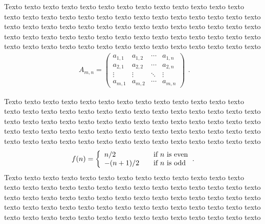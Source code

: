 Texto texto texto texto texto texto texto texto texto texto texto texto texto texto texto texto texto texto texto texto texto texto texto texto texto texto texto texto texto texto texto texto texto texto texto texto texto texto texto texto texto texto texto texto texto texto texto texto texto texto texto texto texto texto texto texto texto texto texto texto texto texto texto texto texto texto texto texto texto
	\begin{equation}
	\label{eq:matriz}
		\begin{aligned}
			A_{m,n} =
			\begin{pmatrix}
			a_{1,1} & a_{1,2} & \cdots & a_{1,n} \\
			a_{2,1} & a_{2,2} & \cdots & a_{2,n} \\
			\vdots  & \vdots  & \ddots & \vdots  \\
			a_{m,1} & a_{m,2} & \cdots & a_{m,n}
			\end{pmatrix}
		\end{aligned}.
	\end{equation}

Texto texto texto texto texto texto texto texto texto texto texto texto texto texto texto texto texto texto texto texto texto texto texto texto texto texto texto texto texto texto texto texto texto texto texto texto texto texto texto texto texto texto texto texto texto texto texto texto texto texto texto texto texto texto texto texto texto texto texto texto texto texto texto texto texto texto texto texto texto
	\begin{equation}
	\label{eq:sistema}
		\begin{aligned}
			f(n) = \left\{ 
			\begin{array}{l l}
			n/2 & \quad \text{if $n$ is even}\\
			-(n+1)/2 & \quad \text{if $n$ is odd}
			\end{array} \right.
		\end{aligned}.
	\end{equation}
Texto texto texto texto texto texto texto texto texto texto texto texto texto texto texto texto texto texto texto texto texto texto texto texto texto texto texto texto texto texto texto texto texto texto texto texto texto texto texto texto texto texto texto texto texto texto texto texto texto texto texto texto texto texto texto texto texto texto texto texto texto texto texto texto texto texto texto texto texto


